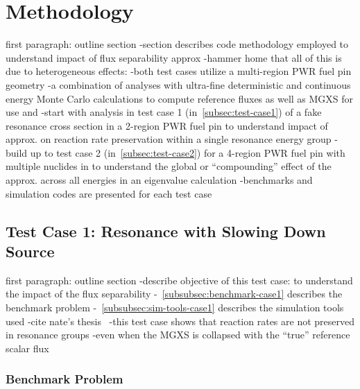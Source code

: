 \section{Methodology}
\label{sec:methodology}

first paragraph: outline section
-section describes code methodology employed to understand impact of flux separability approx 
-hammer home that all of this is due to heterogeneous effects:
  -both test cases utilize a multi-region PWR fuel pin geometry
-a combination of analyses with ultra-fine deterministic and continuous energy Monte Carlo calculations to compute reference fluxes as well as MGXS for use and
-start with analysis in test case 1 (in~\autoref{subsec:test-case1}) of a fake resonance cross section in a 2-region PWR fuel pin to understand impact of approx. on reaction rate preservation within a single resonance energy group
-build up to test case 2 (in~\autoref{subsec:test-case2}) for a 4-region PWR fuel pin with multiple nuclides in to understand the global or ``compounding'' effect of the approx. across all energies in an eigenvalue calculation
-benchmarks and simulation codes are presented for each test case


\subsection{Test Case 1: Resonance with Slowing Down Source}
\label{subsec:test-case1}

first paragraph: outline section
-describe objective of this test case: to understand the impact of the flux separability 
-~\autoref{subsubsec:benchmark-case1} describes the benchmark problem
-~\autoref{subsubsec:sim-tools-case1} describes the simulation tools used
-cite nate's thesis~\cite{gibson2016thesis}
-this test case shows that reaction rates are not preserved in resonance groups
  -even when the MGXS is collapsed with the ``true'' reference scalar flux

\subsubsection{Benchmark Problem}
\label{subsubsec:benchmark-case1}

